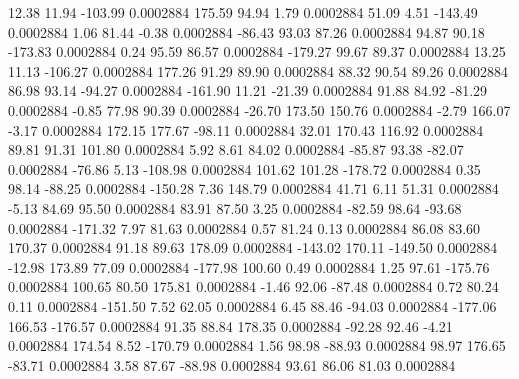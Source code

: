        12.38       11.94     -103.99     0.0002884
      175.59       94.94        1.79     0.0002884
       51.09        4.51     -143.49     0.0002884
        1.06       81.44       -0.38     0.0002884
      -86.43       93.03       87.26     0.0002884
       94.87       90.18     -173.83     0.0002884
        0.24       95.59       86.57     0.0002884
     -179.27       99.67       89.37     0.0002884
       13.25       11.13     -106.27     0.0002884
      177.26       91.29       89.90     0.0002884
       88.32       90.54       89.26     0.0002884
       86.98       93.14      -94.27     0.0002884
     -161.90       11.21      -21.39     0.0002884
       91.88       84.92      -81.29     0.0002884
       -0.85       77.98       90.39     0.0002884
      -26.70      173.50      150.76     0.0002884
       -2.79      166.07       -3.17     0.0002884
      172.15      177.67      -98.11     0.0002884
       32.01      170.43      116.92     0.0002884
       89.81       91.31      101.80     0.0002884
        5.92        8.61       84.02     0.0002884
      -85.87       93.38      -82.07     0.0002884
      -76.86        5.13     -108.98     0.0002884
      101.62      101.28     -178.72     0.0002884
        0.35       98.14      -88.25     0.0002884
     -150.28        7.36      148.79     0.0002884
       41.71        6.11       51.31     0.0002884
       -5.13       84.69       95.50     0.0002884
       83.91       87.50        3.25     0.0002884
      -82.59       98.64      -93.68     0.0002884
     -171.32        7.97       81.63     0.0002884
        0.57       81.24        0.13     0.0002884
       86.08       83.60      170.37     0.0002884
       91.18       89.63      178.09     0.0002884
     -143.02      170.11     -149.50     0.0002884
      -12.98      173.89       77.09     0.0002884
     -177.98      100.60        0.49     0.0002884
        1.25       97.61     -175.76     0.0002884
      100.65       80.50      175.81     0.0002884
       -1.46       92.06      -87.48     0.0002884
        0.72       80.24        0.11     0.0002884
     -151.50        7.52       62.05     0.0002884
        6.45       88.46      -94.03     0.0002884
     -177.06      166.53     -176.57     0.0002884
       91.35       88.84      178.35     0.0002884
      -92.28       92.46       -4.21     0.0002884
      174.54        8.52     -170.79     0.0002884
        1.56       98.98      -88.93     0.0002884
       98.97      176.65      -83.71     0.0002884
        3.58       87.67      -88.98     0.0002884
       93.61       86.06       81.03     0.0002884
